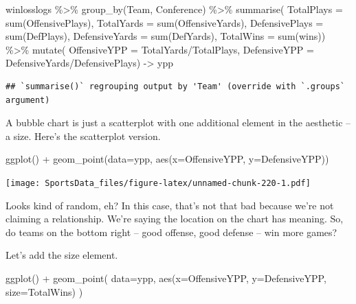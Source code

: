 \documentclass[
]{book}
\newenvironment{Shaded}{\begin{snugshade}}{\end{snugshade}}
\newcommand{\AttributeTok}[1]{\textcolor[rgb]{0.77,0.63,0.00}{#1}}
\newcommand{\FunctionTok}[1]{\textcolor[rgb]{0.00,0.00,0.00}{#1}}
\newcommand{\NormalTok}[1]{#1}
\newcommand{\OtherTok}[1]{\textcolor[rgb]{0.56,0.35,0.01}{#1}}
\newcommand{\SpecialCharTok}[1]{\textcolor[rgb]{0.00,0.00,0.00}{#1}}
\begin{document}
\begin{Shaded}
\begin{Highlighting}[]
\NormalTok{winlosslogs }\SpecialCharTok{\%\textgreater{}\%} 
  \FunctionTok{group\_by}\NormalTok{(Team, Conference) }\SpecialCharTok{\%\textgreater{}\%} 
  \FunctionTok{summarise}\NormalTok{(}
    \AttributeTok{TotalPlays =} \FunctionTok{sum}\NormalTok{(OffensivePlays), }
    \AttributeTok{TotalYards =} \FunctionTok{sum}\NormalTok{(OffensiveYards), }
    \AttributeTok{DefensivePlays =} \FunctionTok{sum}\NormalTok{(DefPlays), }
    \AttributeTok{DefensiveYards =} \FunctionTok{sum}\NormalTok{(DefYards), }
    \AttributeTok{TotalWins =} \FunctionTok{sum}\NormalTok{(wins)) }\SpecialCharTok{\%\textgreater{}\%} 
  \FunctionTok{mutate}\NormalTok{(}
    \AttributeTok{OffensiveYPP =}\NormalTok{ TotalYards}\SpecialCharTok{/}\NormalTok{TotalPlays, }
    \AttributeTok{DefensiveYPP =}\NormalTok{ DefensiveYards}\SpecialCharTok{/}\NormalTok{DefensivePlays) }\OtherTok{{-}\textgreater{}}\NormalTok{ ypp}
\end{Highlighting}
\end{Shaded}

\begin{verbatim}
## `summarise()` regrouping output by 'Team' (override with `.groups` argument)
\end{verbatim}

A bubble chart is just a scatterplot with one additional element in the aesthetic -- a size. Here's the scatterplot version.

\begin{Shaded}
\begin{Highlighting}[]
\FunctionTok{ggplot}\NormalTok{() }\SpecialCharTok{+} \FunctionTok{geom\_point}\NormalTok{(}\AttributeTok{data=}\NormalTok{ypp, }\FunctionTok{aes}\NormalTok{(}\AttributeTok{x=}\NormalTok{OffensiveYPP, }\AttributeTok{y=}\NormalTok{DefensiveYPP))}
\end{Highlighting}
\end{Shaded}

\texttt{[image: SportsData\_files/figure-latex/unnamed-chunk-220-1.pdf]}

Looks kind of random, eh? In this case, that's not that bad because we're not claiming a relationship. We're saying the location on the chart has meaning. So, do teams on the bottom right -- good offense, good defense -- win more games?

Let's add the size element.

\begin{Shaded}
\begin{Highlighting}[]
\FunctionTok{ggplot}\NormalTok{() }\SpecialCharTok{+} 
  \FunctionTok{geom\_point}\NormalTok{(}
    \AttributeTok{data=}\NormalTok{ypp, }
    \FunctionTok{aes}\NormalTok{(}\AttributeTok{x=}\NormalTok{OffensiveYPP, }\AttributeTok{y=}\NormalTok{DefensiveYPP, }\AttributeTok{size=}\NormalTok{TotalWins)}
\NormalTok{    )}
\end{Highlighting}
\end{Shaded}
\end{document}
